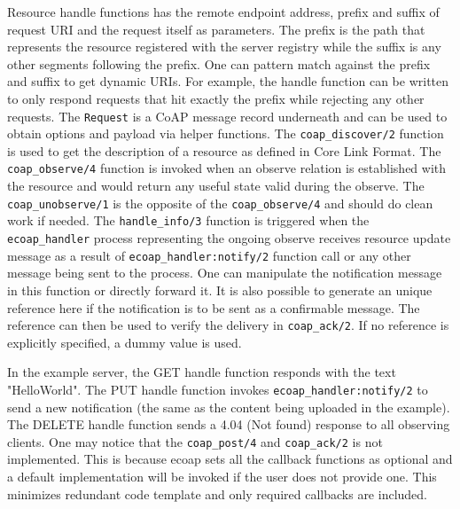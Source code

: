 Resource handle functions has the remote endpoint address, prefix and suffix of request URI and the request itself as parameters. The prefix is the path that represents the resource registered with the server registry while the suffix is any other segments following the prefix. One can pattern match against the prefix and suffix to get dynamic URIs. For example, the handle function can be written to only respond requests that hit exactly the prefix while rejecting any other requests. The \verb|Request| is a CoAP message record underneath and can be used to obtain options and payload via helper functions. The \verb|coap_discover/2| function is used to get the description of a resource as defined in Core Link Format. The \verb|coap_observe/4| function is invoked when an observe relation is established with the resource and would return any useful state valid during the observe. The \verb|coap_unobserve/1| is the opposite of the \verb|coap_observe/4| and should do clean work if needed. The \verb|handle_info/3| function is triggered when the \verb|ecoap_handler| process representing the ongoing observe receives resource update message as a result of \verb|ecoap_handler:notify/2| function call or any other message being sent to the process. One can manipulate the notification message in this function or directly forward it. It is also possible to generate an unique reference here if the notification is to be sent as a confirmable message. The reference can then be used to verify the delivery in \verb|coap_ack/2|. If no reference is explicitly specified, a dummy value is used. 

In the example server, the GET handle function responds with the text "HelloWorld". The PUT handle function invokes \verb|ecoap_handler:notify/2| to send a new notification (the same as the content being uploaded in the example). The DELETE handle function sends a 4.04 (Not found) response to all observing clients. One may notice that the \verb|coap_post/4| and \verb|coap_ack/2| is not implemented. This is because ecoap sets all the callback functions as optional and a default implementation will be invoked if the user does not provide one. This minimizes redundant code template and only required callbacks are included.

